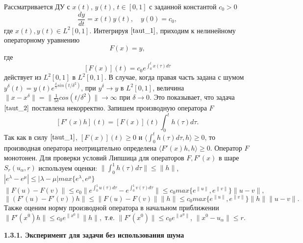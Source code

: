 Рассматривается ДУ с $x(t)$, $y(t)$, $t\in[0, 1]$ с заданной константой $c_0>0$
\begin{equation}\label{taut_1}
\frac{dy}{dt}=x(t)y(t), \quad y(0)=c_0,
\end{equation}
где $x(t), y(t)\in L^2[0,1]$. Интегрируя $\eqref{taut_1}$, приходим к нелинейному операторному уравнению
\begin{equation}\label{taut_2}
F(x)=y,
\end{equation}
где $$[F(x)](t)=c_0 e^{\int_{0}^{t}x(\tau)d\tau}$$
действует из $L^2[0,1]$ в $L^2[0,1]$. В случае, когда правая часть задана с шумом $y^\delta(t)=y(t)e^{\frac{\delta}{5} sin(t/{\delta}^2)}$, при $y^\delta\to y$ в $L^2[0,1]$, величина $\|x-x^\delta\|=\|\frac{1}{5 \delta}cos(t/{\delta}^2)\|\to\infty$ при $\delta\to 0$. Это показывает, что задача $\eqref{taut_2}$ поставлена некорректно. Запишем производную оператора $F$
\begin{equation}\label{taut_3}
[F'(x)h](t)=[F(x)](t)\int_{0}^{t}h(\tau)d\tau.
\end{equation}
Так как в силу $\eqref{taut_1}$, $[F(x)](t)\ge 0$ и $\langle\int_{0}^{t}h(\tau)d\tau, h\rangle\ge 0$, то производная оператора неотрицательно определена $\langle F'(x)h, h\rangle\ge 0$. Оператор $F$ монотонен. Для проверки условий Липшица для операторов $F, F'(x)$ в шаре $S_r(u_\alpha, r)$ используем оценки: $\|\int_{0}^{1}h(\tau)d\tau\|\le\|h\|$, $|e^\lambda-e^\mu|\le|\lambda-\mu|max\{e^\lambda, e^\mu\}$
$$\|F(u)-F(v)\|\le c_0\|e^{\int_{0}^{1}u(\tau)d\tau}-e^{\int_{0}^{1}v(\tau)d\tau}\|
\le c_0 max\{e^{\|u\|},e^{\|v\|}\}\|u-v\|,$$
$$\|(F'(u)-F'(v))h\|\le\|F(u)-F(v)\|\|h\|\le c_0 max\{e^{\|u\|},e^{\|v\|}\}\|h\|\|u-v\|.$$
Также оценим норму производной оператора в начальном приближении $\|F'(x^0)h\|\le c_0 e^{\|x^0\|}\|h\|,$ т.е. $\|F'(x^0)\|\le c_0 e^{\|x^0\|}$, $\|x^0-u_\alpha\|\le r$.

{\bfseries 1.3.1. Эксперимент для задачи без использования шума} 

